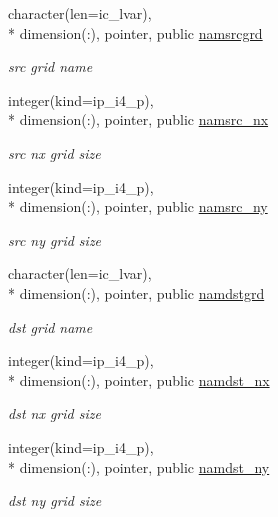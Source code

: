 \begin{DoxyCompactItemize}
character(len=ic\+\_\+lvar), \\*
dimension(\+:), pointer, public \hyperlink{classmod__oasis__namcouple_a589c1bae58b10bcb0cfb30c0893a7895}{namsrcgrd}
\begin{DoxyCompactList}\small\item\em src grid name \end{DoxyCompactList}\item 
integer(kind=ip\+\_\+i4\+\_\+p), \\*
dimension(\+:), pointer, public \hyperlink{classmod__oasis__namcouple_ac8f6c8fe3720739f3d26431a8a600506}{namsrc\+\_\+nx}
\begin{DoxyCompactList}\small\item\em src nx grid size \end{DoxyCompactList}\item 
integer(kind=ip\+\_\+i4\+\_\+p), \\*
dimension(\+:), pointer, public \hyperlink{classmod__oasis__namcouple_ab82c80f007b37865172ddb033a1abb36}{namsrc\+\_\+ny}
\begin{DoxyCompactList}\small\item\em src ny grid size \end{DoxyCompactList}\item 
character(len=ic\+\_\+lvar), \\*
dimension(\+:), pointer, public \hyperlink{classmod__oasis__namcouple_a7a2ed64b0670db38d2287f5d452060e4}{namdstgrd}
\begin{DoxyCompactList}\small\item\em dst grid name \end{DoxyCompactList}\item 
integer(kind=ip\+\_\+i4\+\_\+p), \\*
dimension(\+:), pointer, public \hyperlink{classmod__oasis__namcouple_a6add94418eefdaefd78cd971888a5826}{namdst\+\_\+nx}
\begin{DoxyCompactList}\small\item\em dst nx grid size \end{DoxyCompactList}\item 
integer(kind=ip\+\_\+i4\+\_\+p), \\*
dimension(\+:), pointer, public \hyperlink{classmod__oasis__namcouple_a9035fc89396bad9574c88642d3aac5f0}{namdst\+\_\+ny}
\begin{DoxyCompactList}\small\item\em dst ny grid size \end{DoxyCompactList}\item 

\end{DoxyCompactItemize}
